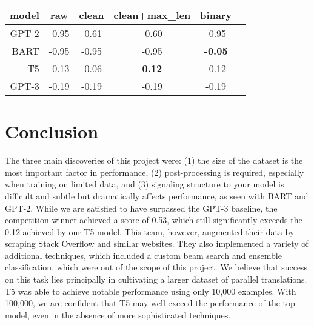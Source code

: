 \documentclass{article}
\begin{document}
\begin{center}
	\begin{tabular}{rccccc}
		\toprule
    model & raw   & clean & clean+max\_len & binary\\
		\midrule
    GPT-2 & -0.95 & -0.61 & -0.60 & -0.95          \\
    BART  & -0.95 & -0.95 & -0.95 & \textbf{-0.05}         \\
    T5    & -0.13 & -0.06 & \textbf{0.12} & -0.12   \\
		\hline
    GPT-3  & -0.19 & -0.19 & -0.19 & -0.19         \\
		\bottomrule
	\end{tabular}
\end{center}



\section{Conclusion}
The three main discoveries of this project were: (1) the size of the dataset is
the most important factor in performance, (2) post-processing is required,
especially when training on limited data, and (3) signaling structure to your
model is difficult and subtle but dramatically affects performance, as seen
with BART and GPT-2. While we are satisfied to have surpassed the GPT-3
baseline, the competition winner achieved a score of 0.53, which still
significantly exceeds the 0.12 achieved by our T5 model. This team, however,
augmented their data by scraping Stack Overflow and similar websites. They also
implemented a variety of additional techniques, which included a custom beam
search and ensemble classification, which were out of the scope of this
project. We believe that success on this task lies principally in cultivating a
larger dataset of parallel translations. T5 was able to achieve notable
performance using only 10,000 examples. With 100,000, we are confident that T5
may well exceed the performance of the top model, even in the absence of more
sophisticated techniques.



\end{document}
